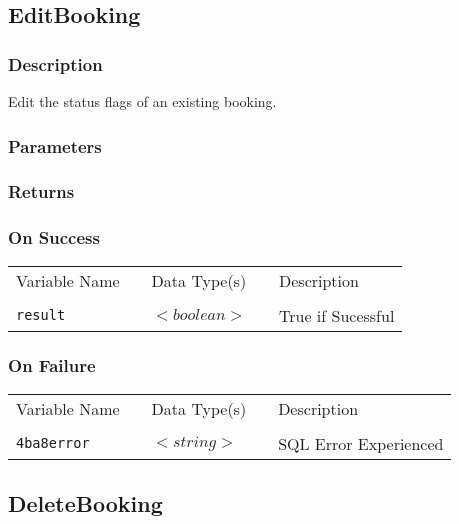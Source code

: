 \subsection{EditBooking}

\subsubsection{Description}

Edit the status flags of an existing booking.

\subsubsection{Parameters}

\subsubsection{Returns}

\subsubsection{On Success}

\begin{tabular}{lllll}
Variable Name	&		&	Data Type(s)		&	&	Description	\\
				&	&	&	&	\\
\verb!result! & \hspace{15mm} & $<boolean>$ & \hspace{15mm} & True if Sucessful \\
\end{tabular}

\subsubsection{On Failure}

\begin{tabular}{lllll}
Variable Name	&		&	Data Type(s)		&	&	Description	\\
				&	&	&	&	\\
\verb!4ba8error! & \hspace{15mm} & $<string>$ & \hspace{15mm} & SQL Error Experienced \\
\end{tabular}


\subsection{DeleteBooking}


